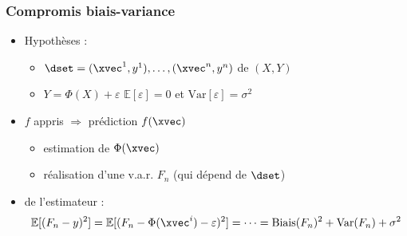 \begin{frame}
  \frametitle{Compromis biais-variance}
  \begin{itemize}
  \item Hypothèses :
    \begin{itemize}
    \item $\dset = (\xvec^1, y^1), \dots, (\xvec^n, y^n)$  de $(X, Y)$
    \item $Y = \Phi(X) + \varepsilon$ \hspace{2em} $\mathbb{E}[\varepsilon] = 0$ et $\text{Var}[\varepsilon] = \sigma^2$
    \end{itemize}
  \item {} $f$ appris $\Rightarrow$ prédiction $f(\xvec)$
    \begin{itemize}
    \item estimation de $\Phi(\xvec)$
    \item réalisation d'une v.a.r. $F_n$ (qui dépend de $\dset$)
  \end{itemize}
  \item {} de l'estimateur :
    \[       \mathbb{E}[(F_n - y)^2] = \mathbb{E}[(F_n - \Phi(\xvec^i) - \varepsilon)^2] = \dots = \text{Biais}(F_n)^2 + \text{Var}(F_n) + \sigma^2 
    \]    
  \end{itemize}
\end{frame}

